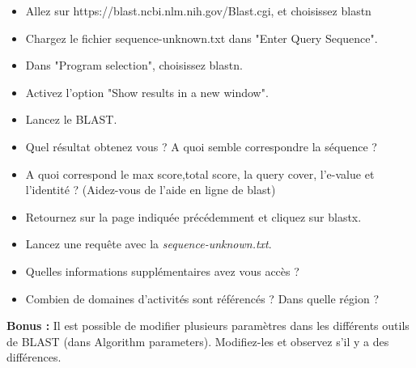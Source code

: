 \documentclass{article}
\begin{document}
\begin{itemize}
\item Allez sur https://blast.ncbi.nlm.nih.gov/Blast.cgi, et choisissez blastn

\item Chargez le fichier sequence-unknown.txt dans "Enter Query Sequence".

\item Dans "Program selection", choisissez blastn.

\item Activez l'option "Show results in a new window".

\item Lancez le BLAST.

\item Quel résultat obtenez vous ? A quoi semble correspondre la séquence ?

\item A quoi correspond le max score,total score, la query cover, l'e-value et l'identité ? (Aidez-vous de l'aide en ligne de blast)

\item Retournez sur la page indiquée précédemment et cliquez sur blastx.

\item Lancez une requête avec la \textit{sequence-unknown.txt}.

\item Quelles informations supplémentaires avez vous accès ?

\item Combien de domaines d'activités sont référencés ? Dans quelle région ?
\end{itemize}

\textbf{Bonus :} Il est possible de modifier plusieurs paramètres dans les différents outils de BLAST (dans Algorithm parameters). Modifiez-les et observez s'il y a des différences.
  
\end{document}
